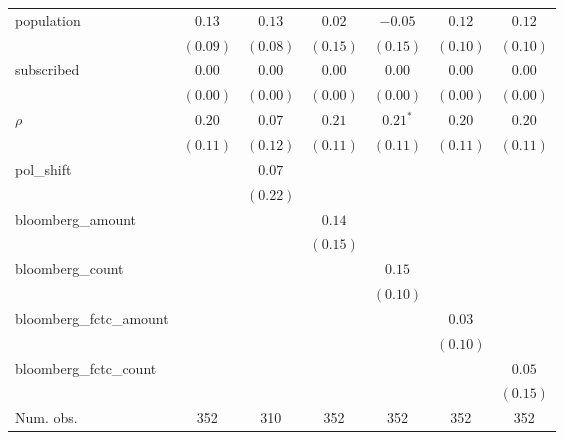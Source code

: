 \begin{table}[!h]
\begin{center}
\begin{tabular}{l c c c c c c }
population              & $0.13$       & $0.13$       & $0.02$       & $-0.05$      & $0.12$       & $0.12$       \\
                        & $(0.09)$     & $(0.08)$     & $(0.15)$     & $(0.15)$     & $(0.10)$     & $(0.10)$     \\
subscribed              & $0.00$       & $0.00$       & $0.00$       & $0.00$       & $0.00$       & $0.00$       \\
                        & $(0.00)$     & $(0.00)$     & $(0.00)$     & $(0.00)$     & $(0.00)$     & $(0.00)$     \\
$\rho$                  & $0.20$       & $0.07$       & $0.21$       & $0.21^{*}$   & $0.20$       & $0.20$       \\
                        & $(0.11)$     & $(0.12)$     & $(0.11)$     & $(0.11)$     & $(0.11)$     & $(0.11)$     \\
pol\_shift              &              & $0.07$       &              &              &              &              \\
                        &              & $(0.22)$     &              &              &              &              \\
bloomberg\_amount       &              &              & $0.14$       &              &              &              \\
                        &              &              & $(0.15)$     &              &              &              \\
bloomberg\_count        &              &              &              & $0.15$       &              &              \\
                        &              &              &              & $(0.10)$     &              &              \\
bloomberg\_fctc\_amount &              &              &              &              & $0.03$       &              \\
                        &              &              &              &              & $(0.10)$     &              \\
bloomberg\_fctc\_count  &              &              &              &              &              & $0.05$       \\
                        &              &              &              &              &              & $(0.15)$     \\
\midrule
Num. obs.               & 352          & 310          & 352          & 352          & 352          & 352          \\

\end{tabular}
\end{center}
\end{table}
